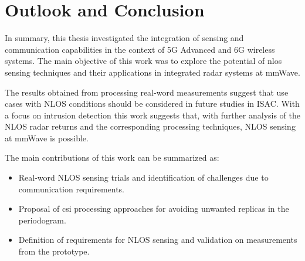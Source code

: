 \chapter{Outlook and Conclusion}

In summary, this thesis investigated the integration of sensing and communication capabilities in the context of 5G Advanced and 6G wireless systems. 
The main objective of this work was to explore the potential of \gls{nlos} sensing techniques and their applications in integrated radar systems at mmWave. 

The results obtained from processing real-word measurements suggest that use cases with NLOS conditions should be considered in future studies in ISAC.
With a focus on intrusion detection this work suggests that, with further analysis of the NLOS radar returns and the corresponding processing techniques, NLOS sensing at mmWave is possible.

The main contributions of this work can be summarized as:

\begin{itemize}
	\item Real-word NLOS sensing trials and identification of challenges due to communication requirements.
	\item Proposal of \gls{csi} processing approaches for avoiding unwanted replicas in the periodogram.
	\item Definition of requirements for NLOS sensing and validation on measurements from the prototype.
\end{itemize}

